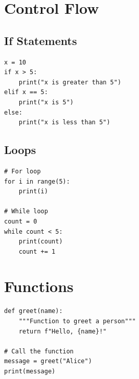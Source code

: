 \documentclass[11pt]{article}
\begin{document}
\section{Control Flow}

\subsection{If Statements}
\begin{lstlisting}
x = 10
if x > 5:
    print("x is greater than 5")
elif x == 5:
    print("x is 5")
else:
    print("x is less than 5")
\end{lstlisting}

\subsection{Loops}
\begin{lstlisting}
# For loop
for i in range(5):
    print(i)

# While loop
count = 0
while count < 5:
    print(count)
    count += 1
\end{lstlisting}

\section{Functions}
\begin{lstlisting}
def greet(name):
    """Function to greet a person"""
    return f"Hello, {name}!"

# Call the function
message = greet("Alice")
print(message)
\end{lstlisting}
\end{document}
